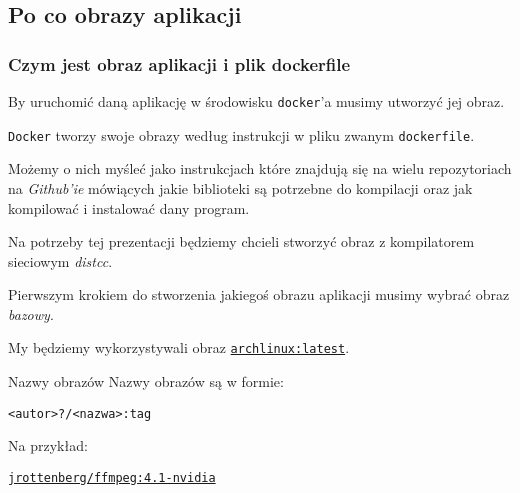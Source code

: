 \documentclass[aspectratio=169]{beamer}
\begin{document}
\subsection{Po co obrazy aplikacji}
\begin{frame}
    \frametitle{Czym jest obraz aplikacji i plik dockerfile}
    By uruchomić daną aplikację w środowisku \texttt{docker}'a musimy utworzyć jej obraz.
    \pause

    \hspace{5mm}

        \texttt{Docker} tworzy swoje obrazy według instrukcji w pliku zwanym \texttt{dockerfile}.
        
    \pause
    \hspace{5mm}

        Możemy o nich myśleć jako instrukcjach które znajdują się na wielu repozytoriach na \emph{Github'ie} mówiących jakie biblioteki są potrzebne do kompilacji oraz jak kompilować i instalować dany program.
\end{frame}
\begin{frame}
    Na potrzeby tej prezentacji będziemy chcieli stworzyć obraz z kompilatorem sieciowym \emph{distcc}.

    \pause
    \vspace{5mm}
    Pierwszym krokiem do stworzenia jakiegoś obrazu aplikacji musimy wybrać obraz \emph{bazowy}.

    \pause
    \vspace{5mm}
    My będziemy wykorzystywali obraz \texttt{\href{https://hub.docker.com/_/archlinux/}{archlinux:latest}}.
    \pause
    \begin{block}{Nazwy obrazów}
        Nazwy obrazów są w formie:
        \vspace{-3mm}
        \begin{center}
            \texttt{<autor>?/<nazwa>:tag}
        \end{center}
        Na przykład:
        \vspace{-3mm}
        \begin{center}
            \href{https://hub.docker.com/r/jrottenberg/ffmpeg/}{\texttt{jrottenberg/ffmpeg:4.1-nvidia}}
        \end{center}
    \end{block}
\end{frame}
\end{document}
